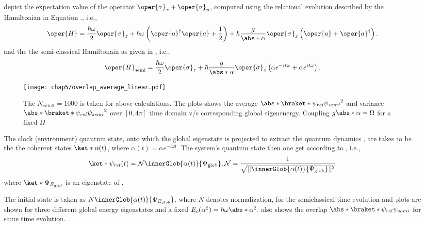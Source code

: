  depict the expectation value of the operator  \(\oper{\sigma}_x + \oper{\sigma}_y\), 
computed using the relational evolution described by the Hamiltonian in Equation ., i.e., 
\begin{eqnarray}
    \label{eq:chap5_JCM_Hamiltonian_linear}
    \oper{H} = \frac{\hbar \omega}{2} \oper{\sigma}_z + \hbar \omega \left(\oper{a}^\dagger \oper{a} + \frac{1}{2}\right) 
    + \hbar \frac{ g}{\abs*{\alpha}} \oper{\sigma}_x\left(\oper{a} + \oper{a}^\dagger\right).
\end{eqnarray}
and the the semi-classical Hamiltonain as given in , i.e., 
\begin{eqnarray}
    \oper{H}_{\text{semi}} = \frac{\hbar\omega}{2} \oper{\sigma}_z 
    + \hbar \frac{g}{\abs*{\alpha}} \oper{\sigma}_x\left( \alpha e^{-it\omega} + \alpha e^{it\omega} \right).
\end{eqnarray}
\begin{figure}[!h]
    \centering
    \texttt{[image: chap5/overlap\_average\_linear.pdf]}
    \caption[Average $\abs*{\braket*{\psi_{rel}}{\psi_{semi}}}^2$ 
    (\& variance $\abs*{\braket*{\psi_{rel}}{\psi_{semi}}}^2$)
     v/s Global Eigen Energy]{The $N_{\mathrm{cutoff}}=1000$ is taken for above calculations.
     The plots shows the average $\abs*{\braket*{\psi_{rel}}{\psi_{semi}}}^2$ and 
     variance $\abs*{\braket*{\psi_{rel}}{\psi_{semi}}}^2$ over \([0, 4\pi]\) time domain 
     v/s corresponding global eigenenergy.
     Coupling \(g\abs*{\alpha}= \Omega\) for a fixed \(\Omega\)}
     \label{fig:chap5_linear_overlap_avg}
\end{figure}


The clock (environment) quantum state, onto which the global eigenstate is projected 
to extract the 
quantum dynamics , 
are takes to be the
the coherent states \(\ket*{\alpha (t)}\), where \(\alpha(t) = \alpha e^{-i\omega t}\). The system's quantum state then one get according to , i.e.,  
\begin{equation}
    \ket*{\psi_{rel}(t)} = \mathcal{N} \innerGlob{\alpha(t)}{\Psi_{\mathrm{glob}}},
    \mathcal{N} = \frac{1}{\sqrt{\lvert \lvert \innerGlob{\alpha(t)}{\Psi_{\mathrm{glob}}} \rvert \rvert^2}}
\end{equation}
where \(\ket*{\Psi_{E_{glob}}}\) is an eigenstate of . 

The initial state is taken as \(N\innerGlob{\alpha(t)}{\Psi_{E_{glob}}}\), where $N$ denotes normalization, for the semiclassical time evolution and plots are shown 
for three different global energy eigenstates and a fixed \(E_c(\alpha^2) = \hbar \omega \abs*{\alpha}^2\).  also shows the overlap \(\abs*{\braket*{\psi_{rel}}{\psi_{semi}}}\)
for same time evolution.

